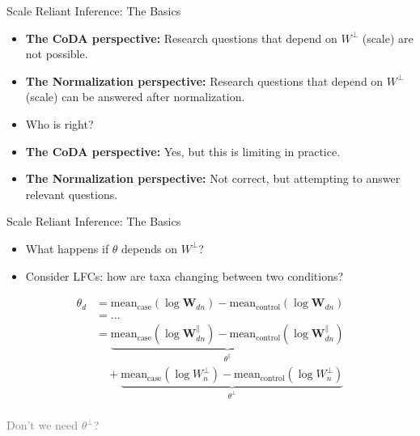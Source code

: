 \documentclass[
  ignorenonframetext,
]{beamer}
\begin{document}
\begin{frame}{Scale Reliant Inference: The Basics}
\protect\hypertarget{scale-reliant-inference-the-basics-1}{}
\begin{itemize}
\item
  \textbf{The CoDA perspective:} Research questions that depend on
  \(W^\perp\) (scale) are not possible.
\item
  \textbf{The Normalization perspective:} Research questions that depend
  on \(W^\perp\) (scale) can be answered after normalization.
\item
  Who is right?
\item
  \textbf{The CoDA perspective:} Yes, but this is limiting in practice.
\item
  \textbf{The Normalization perspective:} Not correct, but attempting to
  answer relevant questions.
\end{itemize}
\end{frame}

\begin{frame}{Scale Reliant Inference: The Basics}
\protect\hypertarget{scale-reliant-inference-the-basics-2}{}
\begin{itemize}
\item
  What happens if \(\theta\) depends on \(W^\perp\)?
\item
  Consider LFCs: how are taxa changing between two conditions?
\end{itemize}

\begin{align*}
\theta_d &= \text{mean}_{\text{case}}(\log \mathbf{W}_{dn}) - \text{mean}_{\text{control}}(\log \mathbf{W}_{dn})\\
&= ... \\
&= \underbrace{\text{mean}_{\text{case}}(\log \mathbf{W}_{dn}^\parallel) - \text{mean}_{\text{control}}(\log \mathbf{W}_{dn}^\parallel)}_{\theta^\parallel}\\
& \, \, \, \, \, \, + \underbrace{\text{mean}_{\text{case}}(\log W_{n}^\perp) - \text{mean}_{\text{control}}(\log W_{n}^\perp)}_{\theta^\perp}\\
\end{align*}

\textcolor{gray}{Don't we need $\theta^\perp$?}
\end{frame}
\end{document}
